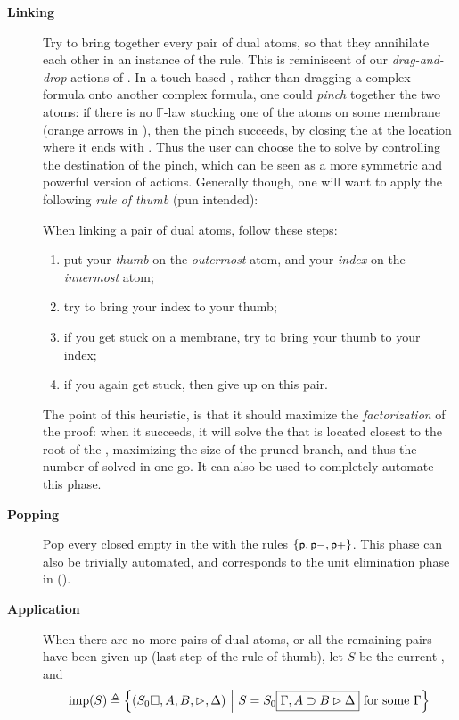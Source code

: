 \begin{description}
  \item[\textbf{Linking}] Try to bring together every pair of dual atoms, so
    that they annihilate each other in an instance of the 
    rule. This is reminiscent of our \emph{drag-and-drop} actions of
    . In a touch-based , rather than dragging a complex formula
    onto another complex formula, one could \emph{pinch} together the two atoms:
    if there is no $\mathbb{F}$-law stucking one of the atoms on some membrane
    (orange arrows in ), then the pinch succeeds, by
    closing the  at the location where it ends with
    . Thus the user can choose the  to solve by
    controlling the destination of the pinch, which can be seen as a more
    symmetric and powerful version of  actions. Generally though, one will
    want to apply the following \emph{rule of thumb} (pun intended):
    \begin{fact}
      When linking a pair of dual atoms, follow these steps:
      \begin{enumerate}
        \item put your \emph{thumb} on the \emph{outermost} atom, and your
              \emph{index} on the \emph{innermost} atom;
        \item try to bring your index to your thumb;
        \item if you get stuck on a membrane, try to bring your thumb to your
              index;
        \item if you again get stuck, then give up on this pair.
      \end{enumerate}
    \end{fact}
    The point of this heuristic, is that it should maximize the
    \emph{factorization} of the proof: when it succeeds, it will solve the
     that is located closest to the root of the , maximizing the size
    of the pruned branch, and thus the number of  solved in one go. It
    can also be used to completely automate this phase.

  \item[\textbf{Popping}] Pop every closed empty  in the  with the
  rules $\{\text{\small$\mathsf{p}$},\text{\small$\mathsf{p{-}}$},\text{\small$\mathsf{p{+}}$}\}$. This phase can also be trivially
  automated, and corresponds to the unit elimination phase in 
  ().

  \item[\textbf{Application}] When there are no more pairs of dual atoms, or all
    the remaining pairs have been given up (last step of the rule of thumb), let
    $S$ be the current , and
    $$\mathrm{imp}(S) \triangleq \left\{(S_0\square, A, B, \mathbin{\rhd}, \Delta) ~\middle|~ S = S_0\fbox{$\Gamma,
          A \supset B \mathbin{\rhd} \Delta$} \text{ for some $\Gamma$}\right\}$$


\end{description}
